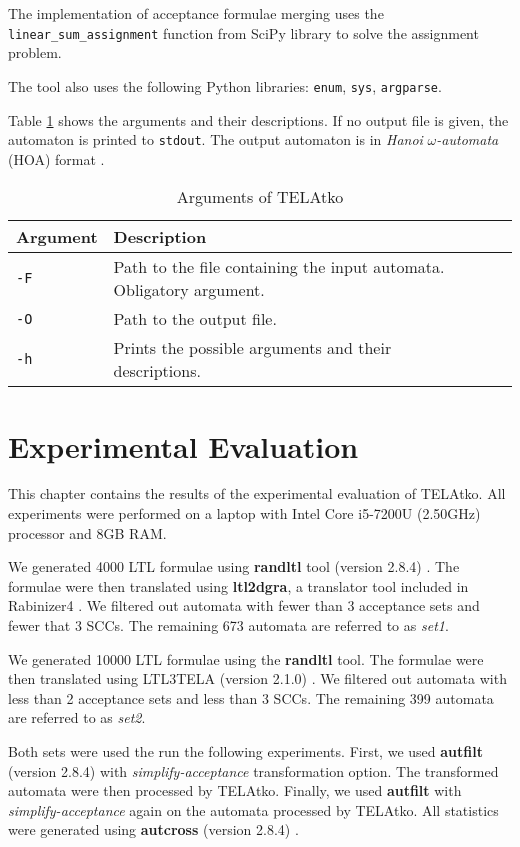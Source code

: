 \documentclass[
  digital, %
  twoside, %
  table,   %
  lof,     %
  lot,     %
]{fithesis3}
\begin{document}
The implementation of acceptance formulae merging uses the \texttt{linear\_sum\_assignment} function from SciPy library \cite{scipy} to solve the assignment problem. 

The tool also uses the following Python libraries: \texttt{enum}, \texttt{sys}, \texttt{argparse}.

Table \ref{tab:arguments} shows the arguments and their descriptions. If no output file is given, the automaton is printed to \texttt{stdout}. The output automaton is in \textit{Hanoi} $\omega$\textit{-automata} (HOA) format \cite{hoa}.

\begin{table}[h]
  \begin{tabularx}{\textwidth}{lXXX}
    \toprule
    Argument & Description \\
    \midrule
    \texttt{-F} & Path to the file containing the input automata. Obligatory argument. \\
    \texttt{-O} & Path to the output file. \\
    \texttt{-h} & Prints the possible arguments and their descriptions. \\    
    \bottomrule
  \end{tabularx}
  \caption{Arguments of TELAtko}
  \label{tab:arguments}
\end{table}

\chapter{Experimental Evaluation}
This chapter contains the results of the experimental evaluation of TELAtko. All experiments were performed on a laptop with Intel Core i5-7200U (2.50GHz) processor and 8GB RAM. 

We generated 4000 LTL \cite{ltl} formulae using \textbf{randltl} tool (version 2.8.4) \cite{randltl}. The formulae were then translated using \textbf{ltl2dgra}, a translator tool included in Rabinizer4 \cite{rabinizer}. We filtered out automata with fewer than 3 acceptance sets and fewer that 3 SCCs. The remaining 673 automata are referred to as \emph{set1}.

We generated 10000 LTL formulae using the \textbf{randltl} tool. The formulae were then translated using LTL3TELA (version 2.1.0) \cite{ltl3tela}. We filtered out automata with less than 2 acceptance sets and less than 3 SCCs. The remaining 399 automata are referred to as \emph{set2}.

Both sets were used the run the following experiments. First, we used \textbf{autfilt} (version 2.8.4) \cite{spot} with \emph{simplify-acceptance} transformation option. The transformed automata were then processed by TELAtko. Finally, we used \textbf{autfilt} with \emph{simplify-acceptance} again on the automata processed by TELAtko. All statistics were generated using \textbf{autcross} (version 2.8.4) \cite{spot}.
\end{document}
